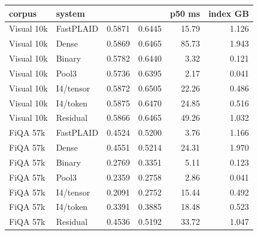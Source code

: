 \begin{tabular}{llrrrr}
\toprule
corpus & system & \ndcg{} & \recall{} & p50 ms & index GB \\
\midrule
Visual 10k & FastPLAID & 0.5871 & 0.6445 & 15.79 & 1.126 \\
Visual 10k & \sysname{} Dense & 0.5869 & 0.6465 & 85.73 & 1.943 \\
Visual 10k & \sysname{} Binary & 0.5782 & 0.6440 & 3.32 & 0.121 \\
Visual 10k & \sysname{} Pool3 & 0.5736 & 0.6395 & 2.17 & 0.041 \\
Visual 10k & \sysname{} I4/tensor & 0.5872 & 0.6505 & 22.26 & 0.486 \\
Visual 10k & \sysname{} I4/token & 0.5875 & 0.6470 & 24.85 & 0.516 \\
Visual 10k & \sysname{} Residual & 0.5866 & 0.6465 & 49.26 & 1.032 \\
FiQA 57k & FastPLAID & 0.4524 & 0.5200 & 3.76 & 1.166 \\
FiQA 57k & \sysname{} Dense & 0.4551 & 0.5214 & 24.31 & 1.970 \\
FiQA 57k & \sysname{} Binary & 0.2769 & 0.3351 & 5.11 & 0.123 \\
FiQA 57k & \sysname{} Pool3 & 0.2359 & 0.2758 & 2.86 & 0.041 \\
FiQA 57k & \sysname{} I4/tensor & 0.2091 & 0.2752 & 15.44 & 0.492 \\
FiQA 57k & \sysname{} I4/token & 0.3391 & 0.3885 & 18.48 & 0.523 \\
FiQA 57k & \sysname{} Residual & 0.4536 & 0.5192 & 33.72 & 1.047 \\
\bottomrule
\end{tabular}
